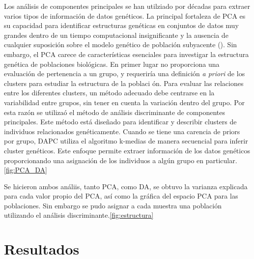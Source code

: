 \documentclass{article}
\begin{document}
Los análisis de componentes principales  se han utilziado por décadas para extraer varios tipos de información de datos genéticos. La principal fortaleza de PCA es su capacidad para identificar estructuras genéticas en conjuntos de datos muy grandes dentro de un tiempo computacional insignificante y la ausencia de cualquier suposición sobre el modelo genético de población subyacente (\citealt{jombart2008adegenet}). Sin embargo, el PCA carece de características esenciales para investigar la estructura genética de poblaciones biológicas. En primer lugar no proporciona una evaluación de pertenencia a un grupo, y requeriría una definición \textit{a priori} de los clusters para estudiar la estructura de la poblaci
ón. Para evaluar las relaciones entre los diferentes clusters, un método adecuado debe centrarse en la variabilidad entre grupos, sin tener en cuenta la variación dentro del grupo. Por esta razón se utilizaó el método de análisis discriminante de componentes principales. Este método está diseñado para identificar y describir clusters de individuos relacionados genéticamente. Cuando se tiene una carencia de priors por grupo, DAPC utiliza el algoritmo k-medias de manera secuencial para inferir cluster genéticos. Este enfoque permite extraer información de los datos genéticos proporcionando una asignación de los individuos a algún grupo en particular.  \ref{fig:PCA_DA} 

Se hicieron ambos análiis, tanto PCA, como DA, se obtuvo la varianza explicada para cada valor propio del PCA, así como la gráfica del espacio PCA para las poblaciones. Sin embargo se pudo asignar a cada muestra una población utilizando el análisis discriminante.\ref{fig:estructura} 



\section{Resultados}
\end{document}

